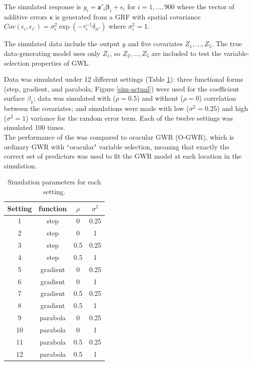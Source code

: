 \documentclass[authoryear, review, 11pt]{elsarticle}
\begin{document}
	The simulated response is $y_i = \bm{z}'_i \bm{\beta}_i + \epsilon_i$ for $i=1, \dots, 900$ where the vector of additive errors $\bm{\epsilon}$ is generated from a GRF with spatial covariance $Cov \left(\epsilon_{i}, \epsilon_{i'} \right) = \sigma_{\epsilon}^2 \exp{\left( -\tau_{\epsilon}^{-1} \delta_{ii'} \right)}$ where $\sigma_{\epsilon}^2=1$.
	
	The simulated data include the output $y$ and five covariates $Z_1, \dots, Z_5$. The true data-generating model uses only $Z_1$, so $Z_2, \dots, Z_5$ are included to test the variable-selection properties of GWL.
	
	Data was simulated under 12 different settings (Table \ref{table:simulation_settings}): three functional forms (step, gradient, and parabola; Figure \ref{sim-actual}) were used for the coefficient surface $\beta_1$; data was simulated with ($\rho = 0.5$) and without ($\rho = 0$) correlation between the covariates; and simulations were made with low ($\sigma^2 = 0.25$) and high ($\sigma^2 = 1$) variance for the random error term. Each of the twelve settings was simulated 100 times.\\
	
	The performance of the  was compared to oracular GWR (O-GWR), which is ordinary GWR with ``oracular" variable selection, meaning that exactly the correct set of predictors was used to fit the GWR model at each location in the simulation.\\
	
\begin{table}[h!]
	\begin{center}
	\begin{tabular}{cccc}
		\hline
		Setting & function & $\rho$ & $\sigma^2$ \\ 
		\hline
		1 & step & 0 & 0.25 \\ 
		2 & step & 0 & 1 \\ 
		3 & step & 0.5 & 0.25 \\ 
		4 & step & 0.5 & 1 \\ 
		5 & gradient & 0 & 0.25 \\ 
		6 & gradient & 0 & 1 \\ 
		7 & gradient & 0.5 & 0.25 \\ 
		8 & gradient & 0.5 & 1 \\ 
		9 & parabola & 0 & 0.25 \\ 
		10 & parabola & 0 & 1 \\ 
		11 & parabola & 0.5 & 0.25 \\ 
		12 & parabola & 0.5 & 1 
	\end{tabular}
	\end{center}
	\caption{Simulation parameters for each setting.\label{table:simulation_settings}}
\end{table}
\end{document}
